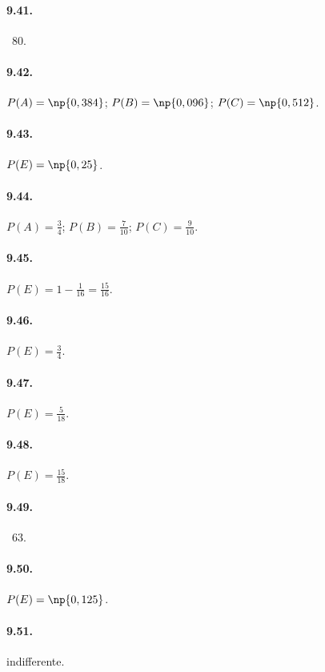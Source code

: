 \begin{multicols}{2}
\paragraph{9.41.} \officialeuro~$80$.

\paragraph{9.42.} $P(A)=\np{0,384}$; $P(B)=\np{0,096}$; $P(C)=\np{0,512}$.

\paragraph{9.43.} $P(E)=\np{0,25}$.

\paragraph{9.44.} $P(A)=\frac 3 4$; $P(B)=\frac 7{10}$; $P(C)=\frac 9{10}$.

\paragraph{9.45.} $P(E)=1-\frac 1{16}=\frac{15}{16}$.

\paragraph{9.46.} $P(E)=\frac 3 4$.

\paragraph{9.47.} $P(E)=\frac 5{18}$.

\paragraph{9.48.} $P(E)=\frac{15}{18}$.

\paragraph{9.49.} \officialeuro~$63$.

\paragraph{9.50.} $P(E)=\np{0,125}$.

\paragraph{9.51.} indifferente.


\end{multicols}
